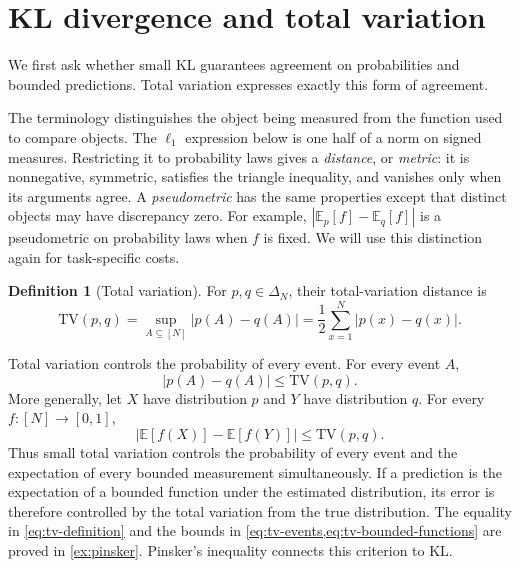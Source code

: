 \documentclass[11pt,twoside]{article}
\newcommand{\E}{\mathbb E}
\newcommand{\TV}{\mathrm{TV}}
\theoremstyle{definition}
\newtheorem{definition}[theorem]{Definition}
\theoremstyle{remark}
\begin{document}
\section{KL divergence and total variation}
\label{sec:kl-tv}

We first ask whether small KL guarantees agreement on probabilities and bounded
predictions. Total variation expresses exactly this form of agreement.

The terminology distinguishes the object being measured from the function
used to compare objects. The \(\ell_1\) expression below is one half of a norm
on signed measures. Restricting it to probability laws gives a
\emph{distance}, or \emph{metric}: it is nonnegative, symmetric, satisfies the
triangle inequality, and vanishes only when its arguments agree. A
\emph{pseudometric} has the same properties except that distinct objects may
have discrepancy zero. For example,
\(|\E_p[f]-\E_q[f]|\) is a pseudometric on probability laws when \(f\) is
fixed. We will use this distinction again for task-specific costs.

\begin{definition}[Total variation]
\label{def:tv}
For $p,q\in\Delta_N$, their total-variation distance is
\begin{equation}
\TV(p,q)
=\sup_{A\subseteq[N]}|p(A)-q(A)|
=\frac12\sum_{x=1}^N|p(x)-q(x)|.
\label{eq:tv-definition}
\end{equation}
\end{definition}

Total variation controls the probability of every event. For every event $A$,
\begin{equation}
|p(A)-q(A)|\le\TV(p,q).
\label{eq:tv-events}
\end{equation}
More generally, let $X$ have distribution $p$ and $Y$ have distribution $q$.
For every $f:[N]\to[0,1]$,
\begin{equation}
|\mathbb E[f(X)]-\mathbb E[f(Y)]|\le\TV(p,q).
\label{eq:tv-bounded-functions}
\end{equation}
Thus small total variation controls the probability of every event and the
expectation of every bounded measurement simultaneously.
If a prediction is the expectation of a bounded function under the estimated
distribution, its error is therefore controlled by the total variation from the
true distribution. The equality in \cref{eq:tv-definition} and the bounds in
\cref{eq:tv-events,eq:tv-bounded-functions} are proved in
\cref{ex:pinsker}. Pinsker's inequality connects this criterion to KL.
\end{document}
